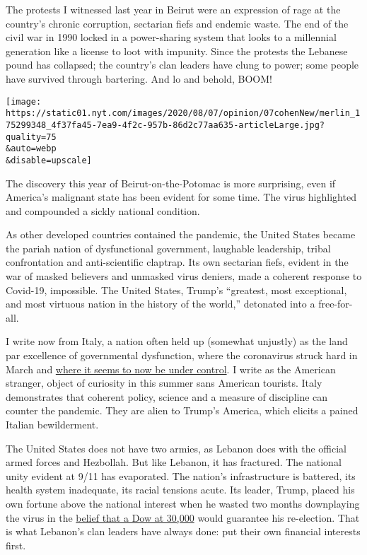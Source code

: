 The protests I witnessed last year in Beirut were an expression of rage
at the country's chronic corruption, sectarian fiefs and endemic waste.
The end of the civil war in 1990 locked in a power-sharing system that
looks to a millennial generation like a license to loot with impunity.
Since the protests the Lebanese pound has collapsed; the country's clan
leaders have clung to power; some people have survived through
bartering. And lo and behold, BOOM!

\texttt{[image: https://static01.nyt.com/images/2020/08/07/opinion/07cohenNew/merlin\_175299348\_4f37fa45-7ea9-4f2c-957b-86d2c77aa635-articleLarge.jpg?quality=75\\\&auto=webp\\\&disable=upscale]}

The discovery this year of Beirut-on-the-Potomac is more surprising,
even if America's malignant state has been evident for some time. The
virus highlighted and compounded a sickly national condition.

As other developed countries contained the pandemic, the United States
became the pariah nation of dysfunctional government, laughable
leadership, tribal confrontation and anti-scientific claptrap. Its own
sectarian fiefs, evident in the war of masked believers and unmasked
virus deniers, made a coherent response to Covid-19, impossible. The
United States, Trump's ``greatest, most exceptional, and most virtuous
nation in the history of the world,'' detonated into a free-for-all.

I write now from Italy, a nation often held up (somewhat unjustly) as
the land par excellence of governmental dysfunction, where the
coronavirus struck hard in March and
\href{https://www.nytimes.com/2020/07/31/world/europe/italy-coronavirus-reopening.html}{where
it seems to now be under control}. I write as the American stranger,
object of curiosity in this summer sans American tourists. Italy
demonstrates that coherent policy, science and a measure of discipline
can counter the pandemic. They are alien to Trump's America, which
elicits a pained Italian bewilderment.

The United States does not have two armies, as Lebanon does with the
official armed forces and Hezbollah. But like Lebanon, it has fractured.
The national unity evident at 9/11 has evaporated. The nation's
infrastructure is battered, its health system inadequate, its racial
tensions acute. Its leader, Trump, placed his own fortune above the
national interest when he wasted two months downplaying the virus in the
\href{https://www.nytimes.com/2020/04/17/opinion/trump-coronavirus.html}{belief
that a Dow at 30,000} would guarantee his re-election. That is what
Lebanon's clan leaders have always done: put their own financial
interests first.

